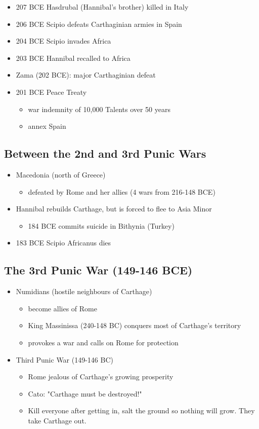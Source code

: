 \documentclass[12pt, twoside]{article}
\begin{document}
\begin{itemize}
\begin{itemize}
	\item 207 BCE Hasdrubal (Hannibal's brother) killed in Italy
	\item 206 BCE Scipio defeats Carthaginian armies in Spain
	\item 204 BCE Scipio invades Africa
	\item 203 BCE Hannibal recalled to Africa
	\item Zama (202 BCE): major Carthaginian defeat
	\item 201 BCE Peace Treaty
		\begin{itemize}
		\item war indemnity of 10,000 Talents over 50 years
		\item annex Spain
		\end{itemize}
	\end{itemize}
\end{itemize}
\subsection{Between the 2nd and 3rd Punic Wars}
\begin{itemize}
\item Macedonia (north of Greece)
	\begin{itemize}
	\item defeated by Rome and her allies (4 wars from 216-148 BCE)
	\end{itemize}
\item Hannibal rebuilds Carthage, but is forced to flee to Asia Minor
	\begin{itemize}
	\item 184 BCE commits suicide in Bithynia (Turkey)
	\end{itemize}
\item 183 BCE Scipio Africanus dies
\end{itemize}

\subsection{The 3rd Punic War (149-146 BCE)}
\begin{itemize}
\item Numidians (hostile neighbours of Carthage)
	\begin{itemize}
	\item become allies of Rome	
	\item King Massinissa (240-148 BC) conquers most of Carthage’s territory
	\item provokes a war and calls on Rome for protection
	\end{itemize}
\item Third Punic War (149-146 BC)
	\begin{itemize}
	\item Rome jealous of Carthage’s growing prosperity
	\item Cato: "Carthage must be destroyed!"
	\item Kill everyone after getting in, salt the ground so nothing will grow.  They take Carthage out.
	\end{itemize}
\end{itemize}
\end{document}
